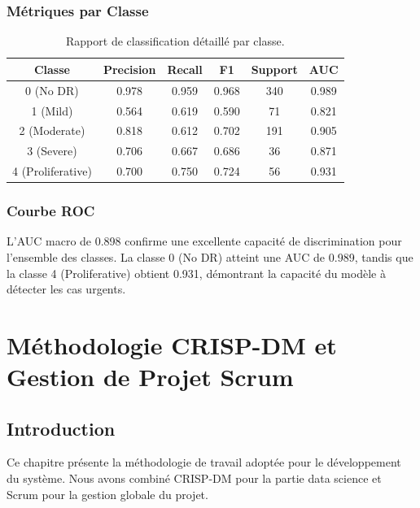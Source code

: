 \documentclass[12pt,a4paper,oneside]{report}
\begin{document}
\subsection{Métriques par Classe}

\begin{table}[H]
\centering
\caption{Rapport de classification détaillé par classe.}
\label{tab:per_class}
\begin{tabular}{|c|c|c|c|c|c|}
\hline
\textbf{Classe} & \textbf{Precision} & \textbf{Recall} & \textbf{F1} & \textbf{Support} & \textbf{AUC} \\
\hline
0 (No DR) & 0.978 & 0.959 & 0.968 & 340 & 0.989 \\
1 (Mild) & 0.564 & 0.619 & 0.590 & 71 & 0.821 \\
2 (Moderate) & 0.818 & 0.612 & 0.702 & 191 & 0.905 \\
3 (Severe) & 0.706 & 0.667 & 0.686 & 36 & 0.871 \\
4 (Proliferative) & 0.700 & 0.750 & 0.724 & 56 & 0.931 \\
\hline
\end{tabular}
\end{table}

\subsection{Courbe ROC}

L'AUC macro de 0.898 confirme une excellente capacité de discrimination
pour l'ensemble des classes. La classe 0 (No DR) atteint une AUC de 0.989,
tandis que la classe 4 (Proliferative) obtient 0.931, démontrant la
capacité du modèle à détecter les cas urgents.

\newpage

\chapter{Méthodologie CRISP-DM et Gestion de Projet Scrum}

\section{Introduction}

Ce chapitre présente la méthodologie de travail adoptée pour le
développement du système. Nous avons combiné CRISP-DM pour la partie
data science et Scrum pour la gestion globale du projet.
\end{document}
